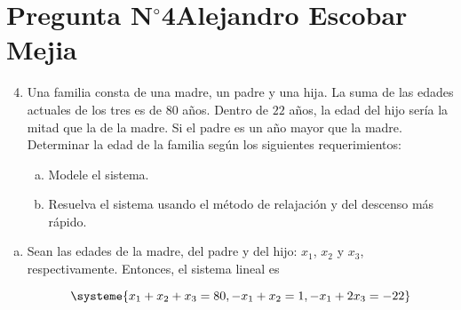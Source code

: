 \section{Pregunta N$^{\circ}$4\qquad Alejandro Escobar Mejia}

\begin{frame}
	\begin{enumerate}\setcounter{enumi}{3}
		\item

		      Una familia consta de una madre, un padre y una hija.
		      La suma de las edades actuales de los tres es de $80$ años.
		      Dentro de $22$ años, la edad del hijo sería la mitad que la
		      de la madre.
		      Si el padre es un año mayor que la madre.
		      Determinar la edad de la familia según los siguientes
		      requerimientos:

		      \begin{enumerate}[a)]
			      \item

			            Modele el sistema.

			      \item

			            Resuelva el sistema usando el método de relajación
			            y del descenso más rápido.
		      \end{enumerate}
	\end{enumerate}

	\begin{solution}
		\begin{enumerate}[a)]
			\item

			      Sean las edades de la \alert{madre}, del \alert{padre} y
			      del \alert{hijo}: \alert{$x_{1}$}, \alert{$x_{2}$} y
			      \alert{$x_{3}$}, respectivamente.
			      Entonces, el sistema lineal es

			      \begin{equation*}
				      \systeme{
				      x_{1}+x_{2}+x_{3}=80,
				      -x_{1}+x_{2}=1,
				      -x_{1}+2x_{3}=-22
				      }
			      \end{equation*}


\end{enumerate}
\end{solution}
\end{frame}
